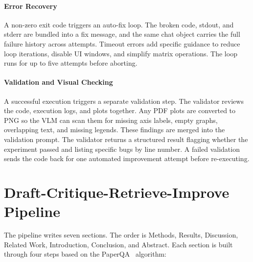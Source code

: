 \paragraph{Error Recovery}
A non-zero exit code triggers an auto-fix loop.
The broken code, stdout, and stderr are bundled into a fix message, and the same chat object carries the full failure history across attempts.
Timeout errors add specific guidance to reduce loop iterations, disable UI windows, and simplify matrix operations.
The loop runs for up to five attempts before aborting.

\paragraph{Validation and Visual Checking}
A successful execution triggers a separate validation step.
The validator reviews the code, execution logs, and plots together.
Any PDF plots are converted to PNG so the VLM can scan them for missing axis labels, empty graphs, overlapping text, and missing legends.
These findings are merged into the validation prompt.
The validator returns a structured result flagging whether the experiment passed and listing specific bugs by line number.
A failed validation sends the code back for one automated improvement attempt before re-executing.



\section{Draft-Critique-Retrieve-Improve Pipeline}
The pipeline writes seven sections. The order is Methods, Results, Discussion, Related Work, Introduction, Conclusion, and Abstract.
Each section is built through four steps based on the PaperQA~\cite{skarlinski2024languageagentsachievesuperhuman} algorithm:

